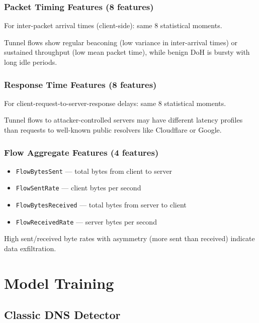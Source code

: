 \documentclass[12pt,a4paper]{article}
\begin{document}
\subsubsection{Packet Timing Features (8 features)}

For inter-packet arrival times (client-side): same 8 statistical moments.

Tunnel flows show regular beaconing (low variance in inter-arrival times) or sustained throughput (low mean packet time), while benign DoH is bursty with long idle periods.

\subsubsection{Response Time Features (8 features)}

For client-request-to-server-response delays: same 8 statistical moments.

Tunnel flows to attacker-controlled servers may have different latency profiles than requests to well-known public resolvers like Cloudflare or Google.

\subsubsection{Flow Aggregate Features (4 features)}

\begin{itemize}
    \item \texttt{FlowBytesSent} --- total bytes from client to server
    \item \texttt{FlowSentRate} --- client bytes per second
    \item \texttt{FlowBytesReceived} --- total bytes from server to client
    \item \texttt{FlowReceivedRate} --- server bytes per second
\end{itemize}

High sent/received byte rates with asymmetry (more sent than received) indicate data exfiltration.

\section{Model Training}

\subsection{Classic DNS Detector}
\end{document}
